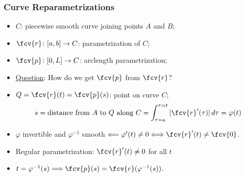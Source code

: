 \begin{frame}
  \frametitle{Curve Reparametrizations}

  \begin{itemize}
    \item $C$: piecewise smooth curve joining points $A$ and $B$;
    \item $\fcv{r} \colon [a,b] \to C$: parametrization of $C$;
    \item $\fcv{p} \colon [0,L] \to C$: arclength parametrization;
    \item \underline{Question}: How do we get $\fcv{p}$ from $\fcv{r}$?
    \item $Q = \fcv{r}(t) = \fcv{p}(s)$: point on curve $C$;
    $$s = \text{distance from } A \text{ to } Q \text{ along } C = \int_{\tau=a}^{\tau=t} |\fcv{r}'(\tau)| \, d\tau = \varphi(t)$$
    \item $\varphi$ invertible and $\varphi^{-1}$ smooth $\Longleftarrow \varphi'(t) \neq 0 \Longleftrightarrow \fcv{r}'(t)\neq \fcv{0}$.
     \item Regular parametrization: $\fcv{r}'(t) \neq 0$ for all $t$
    \item $t=\varphi^{-1}(s) \Longrightarrow \fcv{p}(s) = \fcv{r}(\varphi^{-1}(s))$.
  \end{itemize}
\end{frame}